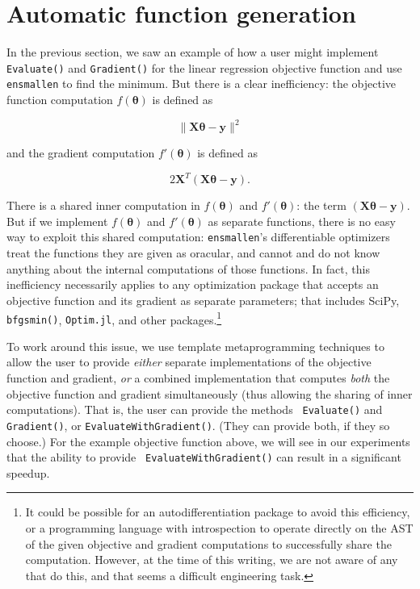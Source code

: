 \section{Automatic function generation}
\label{sec:automatic}

In the previous section, we saw an example of how a user might implement {\tt
Evaluate()} and {\tt Gradient()} for the linear regression objective function
and use {\tt ensmallen} to find the minimum.  But there is a clear inefficiency:
the objective function computation $f(\bm \theta)$ is defined as

\begin{equation*}
\| \bm X \bm \theta - \bm y \|^2
\end{equation*}

\noindent and the gradient computation $f'(\bm \theta)$ is defined as

\begin{equation}
2 \bm X^T (\bm X \bm \theta - \bm y).
\end{equation}

There is a shared inner computation in $f(\bm \theta)$ and $f'(\bm \theta)$: the
term $(\bm X \bm \theta - \bm y)$.  But if we implement $f(\bm \theta)$ and
$f'(\bm \theta)$ as separate functions, there is no easy way to exploit this
shared computation: {\tt ensmallen}'s differentiable optimizers treat the
functions they are given as oracular, and cannot and do not know anything about
the internal computations of those functions.  In fact, this inefficiency
necessarily applies to any optimization package that accepts an objective
function and its gradient as separate parameters; that includes SciPy, {\tt
bfgsmin()}, {\tt Optim.jl}, and other packages.\footnote{It could be possible
for an autodifferentiation package to avoid this efficiency, or a
programming language with introspection to operate directly on the AST of the
given objective and gradient computations to successfully share the computation.
However, at the time of this writing, we are not aware of any that do this, and
that seems a difficult engineering task.}

To work around this issue, we use template metaprogramming techniques to allow
the user to provide {\it either} separate implementations of the objective
function and gradient, {\it or} a combined implementation that computes {\it
both} the objective function and gradient simultaneously (thus allowing the
sharing of inner computations).  That is, the user can provide the methods {\tt
Evaluate()} and {\tt Gradient()}, or {\tt EvaluateWithGradient()}.  (They can
provide both, if they so choose.)  For the example objective function above, we
will see in our experiments that the ability to provide {\tt
EvaluateWithGradient()} can result in a significant speedup.

